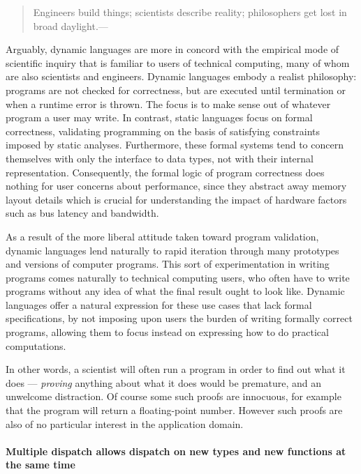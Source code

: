 \begin{quote}
Engineers build things; scientists describe reality; philosophers get lost in broad daylight.---\cite{Gabriel2012}
\end{quote}

Arguably, dynamic languages are more in concord with the empirical mode of scientific inquiry that is familiar to users of technical computing, many of whom are also scientists and engineers. Dynamic languages embody a realist philosophy: programs are not checked for correctness, but are executed until termination or when a runtime error is thrown. The focus is to make sense out of whatever program a user may write. In contrast, static languages focus on formal correctness, validating programming on the basis of satisfying constraints imposed by static analyses. Furthermore, these formal systems tend to concern themselves with only the interface to data types, not with their internal representation. Consequently, the formal logic of program correctness does nothing for user concerns about performance, since they abstract away memory layout details which is crucial for understanding the impact of hardware factors such as bus latency and bandwidth.

As a result of the more liberal attitude taken toward program validation, dynamic languages lend naturally to rapid iteration through many prototypes and versions of computer programs. This sort of experimentation in writing programs comes naturally to technical computing users, who often have to write programs without any idea of what the final result ought to look like. Dynamic languages offer a natural expression for these use cases that lack formal specifications, by not imposing upon users the burden of writing formally correct programs, allowing them to focus instead on expressing how to do practical computations.

In other words, a scientist will often run a program in order to find out what it does ---
\emph{proving} anything about what it does would be premature, and an unwelcome distraction.
Of course some such proofs are innocuous, for example that the program will return a
floating-point number. However such proofs are also of no particular interest in the
application domain.

\paragraph{Multiple dispatch allows dispatch on new types and new functions at the same time}

